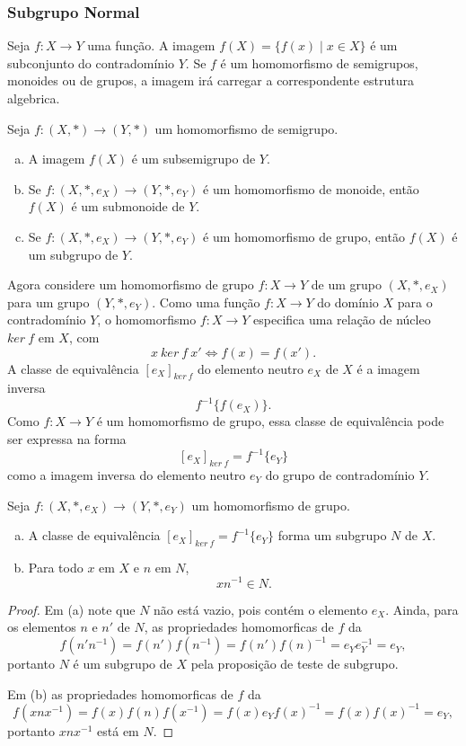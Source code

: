       \subsubsection{Subgrupo Normal}
         Seja $f: X\to Y$ uma função. A imagem $f(X) = \{f(x) \mid x \in X\}$ é um subconjunto do contradomínio $Y$.
         Se $f$ é um homomorfismo de semigrupos, monoides ou de grupos, a imagem irá carregar a correspondente estrutura algebrica.
         \begin{stat}
            Seja $f: (X,*) \to (Y,*)$ um homomorfismo de semigrupo.
            \begin{enumerate}[(a)]
               \item A imagem $f(X)$ é um subsemigrupo de $Y$.
               \item Se $f: (X,*,e_{X}) \to (Y,*,e_{Y})$ é um homomorfismo de monoide, então $f(X)$ é um submonoide de $Y$.
               \item Se $f: (X,*,e_{X}) \to (Y,*,e_{Y})$ é um homomorfismo de grupo, então $f(X)$ é um subgrupo de $Y$.
            \end{enumerate}
         \end{stat}
         Agora considere um homomorfismo de grupo $f:X\to Y$ de um grupo $(X,*,e_{X})$ para um grupo $(Y,*,e_{Y})$. Como uma função $f: X\to Y$ do domínio $X$ para o contradomínio $Y$, o homomorfismo $f: X\to Y$ especifica uma relação de núcleo $ker\ f$ em $X$, com
         $$ x\ ker\ f\ x' \Leftrightarrow f(x)=f(x').$$
         A classe de equivalência $[e_{X}]_{ker\ f}$ do elemento neutro $e_{X}$ de $X$ é a imagem inversa $$f^{-1}\{f(e_{X})\}.$$
         Como $f: X\to Y$ é um homomorfismo de grupo, essa classe de equivalência pode ser expressa na forma $$[e_{X}]_{ker\ f}=f^{-1}\{e_{Y}\}$$ como a imagem inversa do elemento neutro $e_{Y}$ do grupo de contradomínio $Y$.
         \begin{stat}
            Seja $f: (X,*,e_{X}) \to (Y,*,e_{Y})$ um homomorfismo de grupo.
            \begin{enumerate}[(a)]
               \item A classe de equivalência $[e_{X}]_{ker\ f}=f^{-1}\{e_{Y}\}$ forma um subgrupo $N$ de $X$.
               \item Para todo $x$ em $X$ e $n$ em $N$, $$xn^{-1} \in N.$$
            \end{enumerate}
            \begin{proof}
               Em (a) note que $N$ não está vazio, pois contém o elemento $e_{X}.$ Ainda, para os elementos $n$ e $n'$ de $N$, as propriedades homomorficas de $f$ da $$f(n'n^{-1})= f(n')f(n^{-1})=f(n')f(n)^{-1}=e_{Y}e_{Y}^{-1}=e_{Y},$$ portanto $N$ é um subgrupo de $X$ pela proposição de teste de subgrupo.

               Em (b) as propriedades homomorficas de $f$ da $$f(xnx^{-1})=f(x)f(n)f(x^{-1})=f(x)e_{Y}f(x)^{-1} = f(x)f(x)^{-1}=e_{Y},$$ portanto $xnx^{-1}$ está em $N$.
            \end{proof}
         \end{stat}
